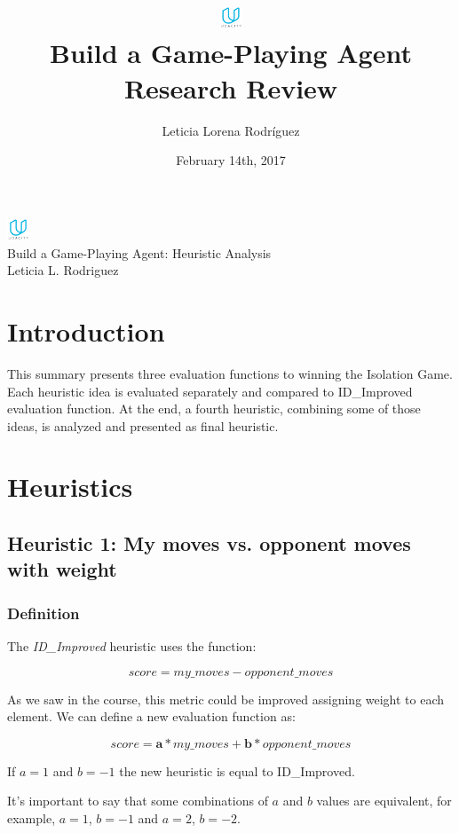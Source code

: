 \documentclass[10pt, a4paper,english]{article}
\author{\normalsize{Leticia Lorena Rodr\'iguez}}
\date{\normalsize{February 14th, 2017}} %
\title{
	\includegraphics[width=0.05\textwidth]{udacity-small.png}\\
Build a Game-Playing Agent \\
\large {Research Review}
} %
\begin{document}
\begin{center}

\includegraphics[width=0.05\textwidth]{udacity-small.png}\\
Build a Game-Playing Agent: Heuristic Analysis \\
Leticia L. Rodriguez \\
\end{center}

\section{Introduction}

This summary presents three evaluation functions to winning the Isolation Game.\\ 

Each heuristic idea is evaluated separately and compared to ID\_Improved evaluation function. At the end, a fourth heuristic, combining some of those ideas, is analyzed and presented as final heuristic.\\

\section{Heuristics}

\subsection{Heuristic 1: My moves vs. opponent moves with weight}

\subsubsection{Definition}

The \textit{ID\_Improved} heuristic uses the function:

\[
	score = my\_moves - opponent\_moves
\]

As we saw in the course, this metric could be improved assigning weight to each element. We can define a new evaluation function as:

\[
	score = \textbf{a}*my\_moves + \textbf{b}*opponent\_moves
\]

If $a=1$ and $b=-1$ the new heuristic is equal to ID\_Improved.

It's important to say that some combinations of $a$ and $b$ values are equivalent, for example, $a=1$, $b=-1$ and $a=2$, $b=-2$. 
\end{document}
